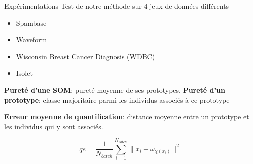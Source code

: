 \documentclass[hyperref={pdfpagelabels=false}]{beamer}
\begin{document}
        \begin{frame}{Expérimentations}
            Test de notre méthode sur 4 jeux de données différents
            \begin{itemize}
                \item Spambase
                \item Waveform
                \item Wisconsin Breast Cancer Diagnosis (WDBC)
                \item Isolet
            \end{itemize}

            \textbf{Pureté d'une SOM}: pureté moyenne de ses prototypes.
            \textbf{Pureté d'un prototype}: classe majoritaire parmi les
            individus associés à ce prototype

            \textbf{Erreur moyenne de quantification}: distance moyenne
            entre un prototype et les individus qui y sont associés.

            \begin{equation*}
                qe = \frac{1}{N_{batch}}\sum_{i=1}^{N_{batch}}\|x_i -
                \omega_{\chi(x_i)}\|^2
            \end{equation*}
        \end{frame}
\end{document}
